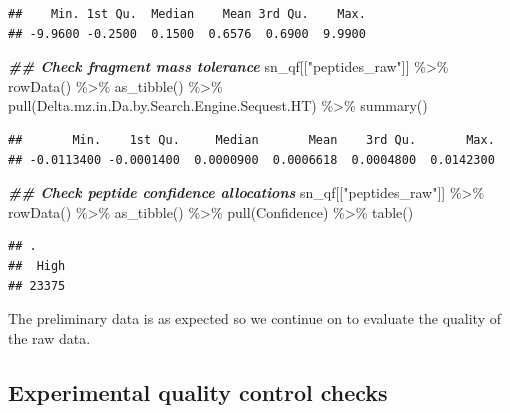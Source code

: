 \documentclass[9pt,a4paper,]{extarticle}
\newenvironment{Shaded}{\begin{snugshade}}{\end{snugshade}}
\newcommand{\DocumentationTok}[1]{\textcolor[rgb]{0.56,0.35,0.01}{\textbf{\textit{#1}}}}
\newcommand{\FunctionTok}[1]{\textcolor[rgb]{0.00,0.00,0.00}{#1}}
\newcommand{\NormalTok}[1]{#1}
\newcommand{\SpecialCharTok}[1]{\textcolor[rgb]{0.00,0.00,0.00}{#1}}
\newcommand{\StringTok}[1]{\textcolor[rgb]{0.31,0.60,0.02}{#1}}
\begin{document}
\begin{verbatim}
##    Min. 1st Qu.  Median    Mean 3rd Qu.    Max. 
## -9.9600 -0.2500  0.1500  0.6576  0.6900  9.9900
\end{verbatim}

\begin{Shaded}
\begin{Highlighting}[]
\DocumentationTok{\#\# Check fragment mass tolerance}
\NormalTok{sn\_qf[[}\StringTok{"peptides\_raw"}\NormalTok{]] }\SpecialCharTok{\%\textgreater{}\%}
  \FunctionTok{rowData}\NormalTok{() }\SpecialCharTok{\%\textgreater{}\%} 
  \FunctionTok{as\_tibble}\NormalTok{() }\SpecialCharTok{\%\textgreater{}\%} 
  \FunctionTok{pull}\NormalTok{(Delta.mz.in.Da.by.Search.Engine.Sequest.HT) }\SpecialCharTok{\%\textgreater{}\%} 
  \FunctionTok{summary}\NormalTok{()}
\end{Highlighting}
\end{Shaded}

\begin{verbatim}
##       Min.    1st Qu.     Median       Mean    3rd Qu.       Max. 
## -0.0113400 -0.0001400  0.0000900  0.0006618  0.0004800  0.0142300
\end{verbatim}

\begin{Shaded}
\begin{Highlighting}[]
\DocumentationTok{\#\# Check peptide confidence allocations}
\NormalTok{sn\_qf[[}\StringTok{"peptides\_raw"}\NormalTok{]] }\SpecialCharTok{\%\textgreater{}\%}
  \FunctionTok{rowData}\NormalTok{() }\SpecialCharTok{\%\textgreater{}\%} 
  \FunctionTok{as\_tibble}\NormalTok{() }\SpecialCharTok{\%\textgreater{}\%} 
  \FunctionTok{pull}\NormalTok{(Confidence) }\SpecialCharTok{\%\textgreater{}\%} 
  \FunctionTok{table}\NormalTok{()}
\end{Highlighting}
\end{Shaded}

\begin{verbatim}
## .
##  High 
## 23375
\end{verbatim}

The preliminary data is as expected so we continue on to evaluate the quality
of the raw data.

\hypertarget{experimental-quality-control-checks-1}{%
\subsection{Experimental quality control checks}\label{experimental-quality-control-checks-1}}
\end{document}
